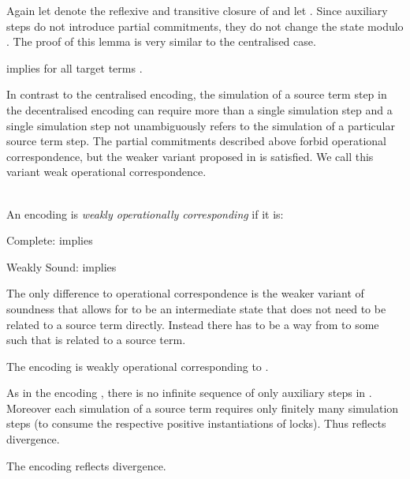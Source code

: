 \documentclass[copyright,creativecommons]{eptcs}
\begin{document}
\noindent
Again let  denote the reflexive and transitive closure of  and let .
Since auxiliary steps do not introduce partial commitments, they do not change the state modulo . The proof of this lemma is very similar to the centralised case.

\begin{lemma}
	 implies  for all target terms .
	\label{lem:auxStepsDecentral}
\end{lemma}

In contrast to the centralised encoding, the simulation of a source term step in the decentralised encoding can require more than a single simulation step and a single simulation step not unambiguously refers to the simulation of a particular source term step. The partial commitments described above forbid operational correspondence, but the weaker variant proposed in \cite{gorla10} is satisfied. We call this variant weak operational correspondence.

\begin{definition}
	\\
	An encoding  is \emph{weakly operationally corresponding} \wrt  if it is:
	\begin{compactitem}
		\item[\; Complete:]  implies 
		\item[\; Weakly Sound:]  implies 
	\end{compactitem}
\end{definition}

The only difference to operational correspondence is the weaker variant of soundness that allows for  to be an intermediate state that does not need to be related to a source term directly. Instead there has to be a way from  to some  such that  is related to a source term.

\begin{theorem}
	The encoding  is weakly operational corresponding \wrt to .
	\label{thm:operationalCorrespondenceDecentral}
\end{theorem}

As in the encoding , there is no infinite sequence of only auxiliary steps in .
Moreover each simulation of a source term requires only finitely many simulation steps (to consume the respective positive instantiations of locks). Thus  reflects divergence.

\begin{theorem}
	The encoding  reflects divergence.
	\label{thm:divergenceReflectionDecentral}
\end{theorem}
\end{document}
